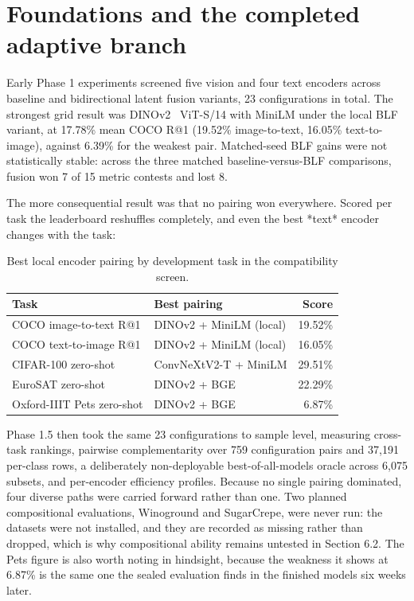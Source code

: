 \documentclass[11pt,a4paper,oneside]{report}
\begin{document}
\section{Foundations and the completed adaptive branch}
Early Phase 1 experiments screened five vision and four text encoders across baseline and bidirectional latent fusion variants, 23 configurations in total. The strongest grid result was DINOv2~\cite{oquab2023dinov2} ViT-S/14 with MiniLM under the local BLF variant, at 17.78\% mean COCO R@1 (19.52\% image-to-text, 16.05\% text-to-image), against 6.39\% for the weakest pair. Matched-seed BLF gains were not statistically stable: across the three matched baseline-versus-BLF comparisons, fusion won 7 of 15 metric contests and lost 8.

The more consequential result was that no pairing won everywhere. Scored per task the leaderboard reshuffles completely, and even the best *text* encoder changes with the task:

\begin{table}[htbp]
\centering
\caption{Best local encoder pairing by development task in the compatibility screen.}
\label{tab:compatibility}
\begin{tabular}{L{4.0cm}L{5.0cm}r}
\toprule
Task & Best pairing & Score \\
\midrule
COCO image-to-text R@1 & DINOv2 + MiniLM (local) & 19.52\% \\
COCO text-to-image R@1 & DINOv2 + MiniLM (local) & 16.05\% \\
CIFAR-100 zero-shot & ConvNeXtV2-T + MiniLM & 29.51\% \\
EuroSAT zero-shot & DINOv2 + BGE & 22.29\% \\
Oxford-IIIT Pets zero-shot & DINOv2 + BGE & 6.87\% \\
\bottomrule
\end{tabular}
\end{table}
Phase 1.5 then took the same 23 configurations to sample level, measuring cross-task rankings, pairwise complementarity over 759 configuration pairs and 37,191 per-class rows, a deliberately non-deployable best-of-all-models oracle across 6,075 subsets, and per-encoder efficiency profiles. Because no single pairing dominated, four diverse paths were carried forward rather than one. Two planned compositional evaluations, Winoground and SugarCrepe, were never run: the datasets were not installed, and they are recorded as missing rather than dropped, which is why compositional ability remains untested in Section 6.2. The Pets figure is also worth noting in hindsight, because the weakness it shows at 6.87\% is the same one the sealed evaluation finds in the finished models six weeks later.
\end{document}
